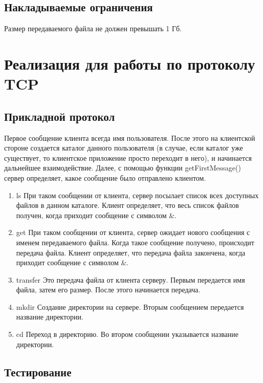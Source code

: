 \documentclass[12pt,a4paper]{report}
\begin{document}
\section{Накладываемые ограничения}
Размер передаваемого файла не должен превышать 1 Гб.
\chapter{Реализация для работы по протоколу TCP}
\section{Прикладной протокол}
\label{protocol_tcp}
Первое сообщение клиента всегда имя пользователя. После этого на клиентской стороне создается каталог данного пользователя (в случае, если каталог уже существует, то клиентское приложение просто переходит в него), и начинается дальнейшее взаимодействие.
Далее, с помощью функции getFirstMessage() сервер определяет, какое сообщение было отправлено клиентом. 
\begin{enumerate}
\item{ls}
При таком сообщении от клиента, сервер посылает список всех доступных файлов в данном каталоге. Клиент определяет, что весь список файлов получен, когда приходит сообщение с символом \&.
\item{get}
При таком сообщении от клиента, сервер ожидает нового сообщения с именем передаваемого файла. Когда такое сообщение получено, происходит передача файла. Клиент определяет, что передача файла закончена, когда приходит сообщение с символом \&.
\item{transfer}
Это передача файла от клиента серверу. Первым передается имя файла, затем его размер. После этого начинается передача.
\item{mkdir}
Создание директории на сервере. Вторым сообщением передается название директории.
\item{cd}
Переход в директорию. Во втором сообщении указывается название директории.
\end{enumerate} 

\section{Тестирование}
\end{document}
